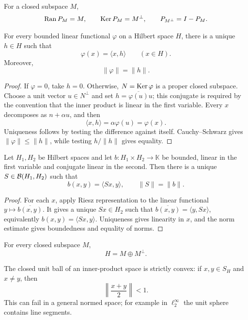 \begin{notetheorem}
For a closed subspace $M$,
\[
  \operatorname{Ran} P_M=M,
  \qquad
  \operatorname{Ker} P_M=M^\perp,
  \qquad
  P_{M^\perp}=I-P_M.
\]
\end{notetheorem}

\begin{notetheorem}
For every bounded linear functional $\varphi$ on a Hilbert space $H$, there
is a unique $h\in H$ such that
\[
  \varphi(x)=\langle x,h\rangle
  \qquad(x\in H).
\]
Moreover,
\[
  \|\varphi\|=\|h\|.
\]
\end{notetheorem}

\begin{proof}
If $\varphi=0$, take $h=0$.  Otherwise, $N=\operatorname{Ker}\varphi$ is a proper closed
subspace.  Choose a unit vector $u\in N^\perp$ and set
$h=\overline{\varphi(u)}u$; this conjugate is required by the convention that
the inner product is linear in the first variable.  Every $x$ decomposes as
$n+\alpha u$, and then
\[
  \langle x,h\rangle
  =\alpha\varphi(u)=\varphi(x).
\]
Uniqueness follows by testing the difference against itself.  Cauchy--Schwarz
gives $\|\varphi\|\le\|h\|$, while testing $h/\|h\|$ gives equality.
\end{proof}

\begin{notetheorem}
Let $H_1,H_2$ be Hilbert spaces and let
$b\colon H_1\times H_2\to\mathbb K$ be bounded, linear in the first variable
and conjugate linear in the second.  Then there is a unique
$S\in\mathcal{B}(H_1,H_2)$ such that
\[
  b(x,y)=\langle Sx,y\rangle,
  \qquad
  \|S\|=\|b\|.
\]
\end{notetheorem}

\begin{proof}
For each $x$, apply Riesz representation to the linear functional
$y\mapsto\overline{b(x,y)}$.  It gives a unique $Sx\in H_2$ such that
$\overline{b(x,y)}=\langle y,Sx\rangle$, equivalently
$b(x,y)=\langle Sx,y\rangle$.  Uniqueness gives linearity in $x$, and the
norm estimate gives boundedness and equality of norms.
\end{proof}

\begin{notecorollary}
For every closed subspace $M$,
\[
  H=M\oplus M^\perp.
\]
\end{notecorollary}

\begin{noteexercise}
The closed unit ball of an inner-product space is strictly convex: if
$x,y\in S_H$ and $x\ne y$, then
\[
  \left\|\frac{x+y}{2}\right\|<1.
\]
This can fail in a general normed space; for example in $\ell^\infty_2$ the
unit sphere contains line segments.
\end{noteexercise}

